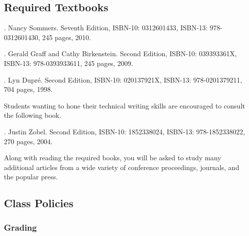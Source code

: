 \subsection*{Required Textbooks}


  . Nancy Sommers. Seventh Edition,  ISBN-10: 0312601433, ISBN-13: 978-0312601430,
  245 pages, 2010.


  . Gerald Graff and Cathy Birkenstein. Second Edition,  
  ISBN-10: 039393361X, ISBN-13: 978-0393933611, 245 pages, 2009.


. Lyn Dupr\'e. Second Edition,  ISBN-10: 020137921X,
ISBN-13: 978-0201379211, 704 pages, 1998.

\noindent
Students wanting to hone their technical writing skills are encouraged to consult the following book.

.  Justin Zobel. Second Edition,  ISBN-10: 1852338024, ISBN-13:
978-1852338022, 270 pages, 2004.

\noindent 
Along with reading the required books, you will be asked to study many additional articles from a wide variety of
conference proceedings, journals, and the popular press.


\subsection*{Class Policies}

\subsubsection*{Grading}

